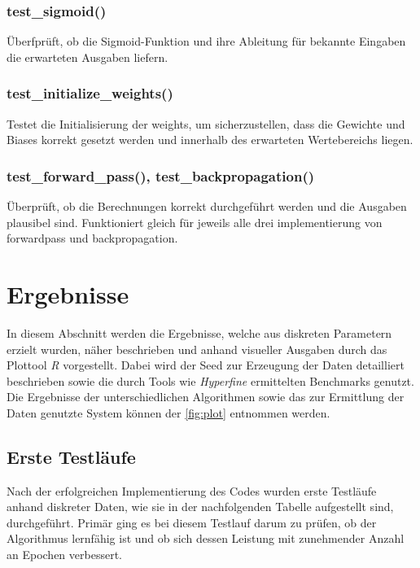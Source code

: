 \documentclass[a4paper, 12pt]{article}
\begin{document}
\subsubsection{test\_sigmoid()}

Überfprüft, ob die Sigmoid-Funktion und ihre Ableitung für bekannte Eingaben die erwarteten Ausgaben liefern.

\subsubsection{test\_initialize\_weights()}

Testet die Initialisierung der weights, um sicherzustellen, dass die Gewichte und Biases korrekt gesetzt werden und innerhalb des erwarteten Wertebereichs liegen.

\subsubsection{test\_forward\_pass(), test\_backpropagation()}

Überprüft, ob die Berechnungen korrekt durchgeführt werden und die Ausgaben plausibel sind.
Funktioniert gleich für jeweils alle drei implementierung von forwardpass und backpropagation.


\newpage %

\section{Ergebnisse}\label{chapter..4}

In diesem Abschnitt werden die Ergebnisse, welche aus diskreten Parametern erzielt wurden, näher 
beschrieben und anhand visueller Ausgaben durch das Plottool \textit{R} vorgestellt. Dabei wird der 
Seed zur Erzeugung der Daten detailliert beschrieben sowie die durch Tools wie \textit{Hyperfine} 
ermittelten Benchmarks genutzt. Die Ergebnisse der unterschiedlichen Algorithmen sowie das zur 
Ermittlung der Daten genutzte System können der \autoref{fig:plot} entnommen werden.

\subsection{Erste Testläufe}\label{chapter..4.1}

Nach der erfolgreichen Implementierung des Codes wurden erste Testläufe anhand diskreter Daten, wie 
sie in der nachfolgenden Tabelle aufgestellt sind, durchgeführt. Primär ging es bei diesem Testlauf 
darum zu prüfen, ob der Algorithmus lernfähig ist und ob sich dessen Leistung mit zunehmender Anzahl 
an Epochen verbessert.
\end{document}
